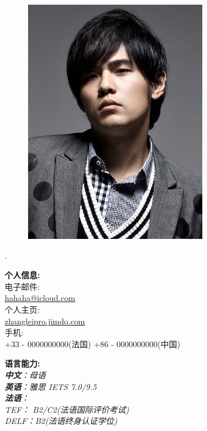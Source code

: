 \documentclass[a4paper,12pt,final]{memoir}
\newcommand{\myThemeColor}{RoyalBlue}
\newcommand{\CVItem}[1]
	{\textbf{\color{\myThemeColor} #1}}
\begin{document}
\begin{CJK*}{UTF8}{gbsn}%
\begin{figure}
	\hfill
	\includegraphics[width=0.8\columnwidth]{photo}
	\vspace{-7cm}
\end{figure}
\begin{flushright}\footnotesize
.\\
\vskip 6cm
    \raggedright
	\CVItem{{\large 个人信息:}}\\
	电子邮件:\\
	\href{mailto:hahaha@icloud.com}{hahaha@icloud.com}  \\
	个人主页:\\
	\href{http://zhangleipro.jimdo.com/}{zhangleipro.jimdo.com} \\
	手机:\\
	+33 - 0000000000(法国)
	+86 - 0000000000(中国)
		
	\CVItem{{\large 语言能力:}}\\
	\textit{\textbf{中文}：母语 \\\textbf{英语}：雅思 IETS 7.0/9.5\\ \textbf{法语}：\\
		    	TEF： B2/C2(法语国际评价考试)\\
		    	DELF：B2(法语终身认证学位)
			}
	

\end{flushright}
\end{CJK*}
\end{document}
